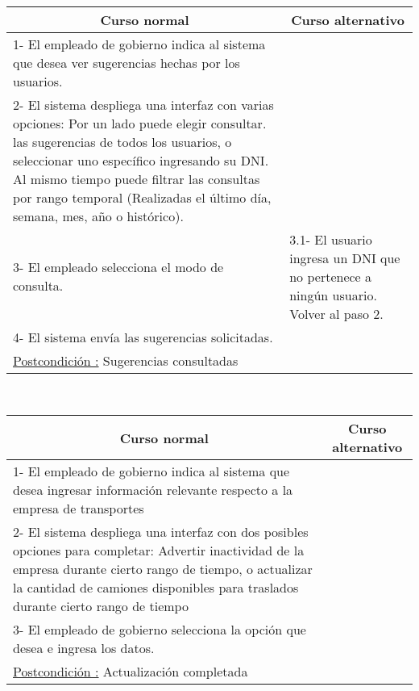 ~


\begin{center}
    \centering
    \begin{tabular}{ | p{11cm} | p{6cm} | }
    	\multicolumn{1}{c}{\cellcolor{black!30}\textbf{Curso normal}} & 
    	\multicolumn{1}{c}{\cellcolor{black!30}\textbf{Curso alternativo}} \\ \hline
    	1- El empleado de gobierno indica al sistema que desea ver sugerencias hechas por los usuarios. & \\ \hline
    	2- El sistema despliega una interfaz con varias opciones: Por un lado puede elegir consultar. 
    	las sugerencias de todos los usuarios, o seleccionar uno específico ingresando su DNI. Al mismo
    	tiempo puede filtrar las consultas por rango temporal (Realizadas el último día, semana, mes, año
    	o histórico). & \\ \hline
    	3- El empleado selecciona el modo de consulta. & 3.1- El usuario ingresa un DNI que no pertenece a ningún usuario. Volver al paso 2. \\ \hline
    	4- El sistema envía las sugerencias solicitadas. & \\ \hline
	\underline{Postcondición :} Sugerencias consultadas & \\ \hline
    \end{tabular}
\end{center}

~


\begin{center}
    \centering
    \begin{tabular}{ | p{11cm} | p{6cm} | }
    	\multicolumn{1}{c}{\cellcolor{black!30}\textbf{Curso normal}} & 
    	\multicolumn{1}{c}{\cellcolor{black!30}\textbf{Curso alternativo}} \\ \hline
    	1- El empleado de gobierno indica al sistema que desea ingresar información relevante respecto a la empresa de transportes & \\ \hline
    	2- El sistema despliega una interfaz con dos posibles opciones para completar: Advertir inactividad de la empresa durante cierto rango de tiempo,
    	o actualizar la cantidad de camiones disponibles para traslados durante cierto rango de tiempo & \\ \hline
    	3- El empleado de gobierno selecciona la opción que desea e ingresa los datos. & \\ \hline
	\underline{Postcondición :} Actualización completada & \\ \hline
    \end{tabular}
\end{center}

